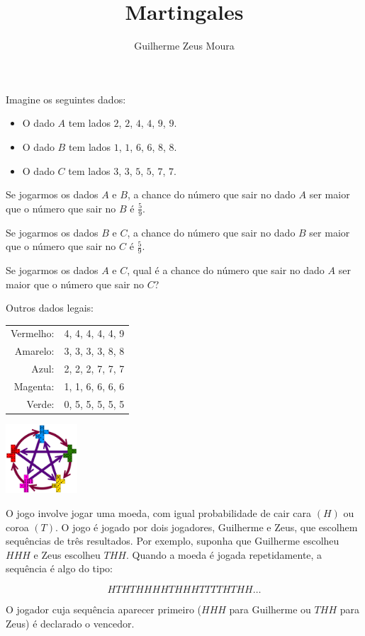\documentclass[10pt,a4paper]{article}
\title{Martingales}
\author{Guilherme Zeus Moura}
\renewcommand\playerA[1]{Guilherme}
\renewcommand\playerB[1]{Zeus}
\begin{document}
	
	\zeustitle
	\begin{exmp}
		Imagine os seguintes dados:
		\begin{itemize}
			\item O dado $A$ tem lados $2$, $2$, $4$, $4$, $9$, $9$.
			\item O dado $B$ tem lados $1$, $1$, $6$, $6$, $8$, $8$.
			\item O dado $C$ tem lados $3$, $3$, $5$, $5$, $7$, $7$.	
		\end{itemize}

		Se jogarmos os dados $A$ e $B$, a chance do número que sair no dado $A$ ser maior que o número que sair no $B$ é $\frac{5}{9}$.

		Se jogarmos os dados $B$ e $C$, a chance do número que sair no dado $B$ ser maior que o número que sair no $C$ é $\frac{5}{9}$.

		Se jogarmos os dados $A$ e $C$, qual é a chance do número que sair no dado $A$ ser maior que o número que sair no $C$?
	\end{exmp}

	\begin{exmp}
		Outros dados legais:
	
		\begin{multicols}{2}
		
			\begin{tabular}{rl}
			Vermelho: & 4, 4, 4, 4, 4, 9\\
			Amarelo:  & 3, 3, 3, 3, 8, 8\\
			Azul:     & 2, 2, 2, 7, 7, 7\\
			Magenta:  & 1, 1, 6, 6, 6, 6\\
			Verde:    & 0, 5, 5, 5, 5, 5
		\end{tabular}
	
	
	\begin{center}
		\includegraphics[width=0.2\textwidth]{diagram1.png}
	\end{center}

	\end{multicols}

	\end{exmp}

	\begin{exmp}
		O jogo involve jogar uma moeda, com igual probabilidade de cair cara $(H)$ ou coroa $(T)$. O jogo é jogado por dois jogadores, \playerA{$A$} e \playerB{$B$}, que escolhem sequências de três resultados. Por exemplo, suponha que \playerA{o jogador $A$} escolheu $HHH$ e \playerB{o jogador $B$} escolheu $THH$. Quando a moeda é jogada repetidamente, a sequência é algo do tipo:
		
		$$HTHTHHHHTHHHTTTTHTHH\dots$$

		O jogador cuja sequência aparecer primeiro ($HHH$ para \playerA{o jogador $A$} ou $THH$ para \playerB{o jogador $B$}) é declarado o vencedor.
	\end{exmp}
\end{document}
